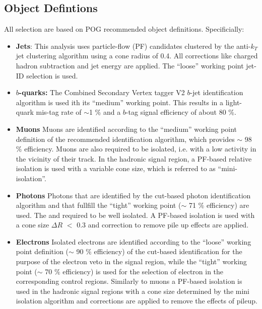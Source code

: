 


\subsection{Object Defintions}

All selection are based on POG recommended object definitions. Specificially:

\begin{itemize}
  \item{\bf Jets}: This analysis uses particle-flow (PF) candidates clustered by the anti-$k_{T}$ jet clustering algorithm \cite{Cacciari:2008gp} using a cone radius of 0.4. All corrections
    like charged hadron subtraction and jet energy are applied. The ``loose'' working point jet-ID selection is used.
    
  \item{\bf $b$-quarks:} The Combined Secondary Vertex tagger V2 $b$-jet identification algorithm is used ith its ``medium'' working point. This results in a light-quark mis-tag rate of $\sim$1 \%  and a $b$-tag signal efficiency of about 80 \%.   

  \item{\bf Muons} Muons are identified according to the ``medium'' working point definition of the recommended identification algorithm, which provides $\sim$ 98 $\%$ efficiency. 
Muons are also required to be isolated, i.e. with a low activity in the vicinity of their track. In the hadronic signal region, a PF-based relative isolation is used with a variable cone size, which is referred to as ``mini-isolation''. 

  \item{\bf Photons} Photons that are identified by the cut-based photon identification algorithm \cite{photon-id} and that fullfill the ``tight'' working point ($\sim$ 71 $\%$ efficiency) are used. The and required to be well isolated.  A PF-based isolation is used with a cone size $\Delta R$ $<$ 0.3  and correction to remove pile up effects are applied.


  \item{\bf Electrons} Isolated electrons are identified according to the ``loose'' working point definition ($\sim$ 90 $\%$ efficiency)  of the cut-based identification \cite{electron-id} for the purpose of the electron veto in the signal region, while the ``tight'' working point ($\sim$ 70 $\%$ efficiency) is used for the selection of electron in the corresponding control regions. Similarly to muons a PF-based isolation \cite{pf-photon} is used in the hadronic signal regions with a cone size determined by the mini isolation algorithm and corrections are applied to remove the effects of pileup.


\end{itemize}
